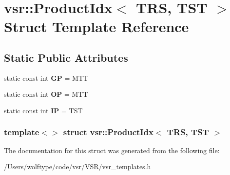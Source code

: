 \hypertarget{structvsr_1_1_product_idx_3_01_t_r_s_00_01_t_s_t_01_4}{\section{vsr\-:\-:Product\-Idx$<$ T\-R\-S, T\-S\-T $>$ Struct Template Reference}
\label{structvsr_1_1_product_idx_3_01_t_r_s_00_01_t_s_t_01_4}
}
\subsection*{Static Public Attributes}
\begin{DoxyCompactItemize}
\item 
\hypertarget{structvsr_1_1_product_idx_3_01_t_r_s_00_01_t_s_t_01_4_a31b81583e6be4a125ea5a2cbb73caf8f}{static const int {\bfseries G\-P} = M\-T\-T}\label{structvsr_1_1_product_idx_3_01_t_r_s_00_01_t_s_t_01_4_a31b81583e6be4a125ea5a2cbb73caf8f}

\item 
\hypertarget{structvsr_1_1_product_idx_3_01_t_r_s_00_01_t_s_t_01_4_a2e0c1012c178980245a445cd653b7dc5}{static const int {\bfseries O\-P} = M\-T\-T}\label{structvsr_1_1_product_idx_3_01_t_r_s_00_01_t_s_t_01_4_a2e0c1012c178980245a445cd653b7dc5}

\item 
\hypertarget{structvsr_1_1_product_idx_3_01_t_r_s_00_01_t_s_t_01_4_a4a176c0ce81be50b0adf0b49128cf890}{static const int {\bfseries I\-P} = T\-S\-T}\label{structvsr_1_1_product_idx_3_01_t_r_s_00_01_t_s_t_01_4_a4a176c0ce81be50b0adf0b49128cf890}

\end{DoxyCompactItemize}
\subsubsection*{template$<$$>$ struct vsr\-::\-Product\-Idx$<$ T\-R\-S, T\-S\-T $>$}



The documentation for this struct was generated from the following file\-:\begin{DoxyCompactItemize}
\item 
/\-Users/wolftype/code/vsr/\-V\-S\-R/vsr\-\_\-templates.\-h\end{DoxyCompactItemize}
